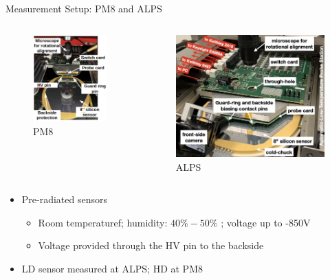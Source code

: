 \documentclass{beamer}
\begin{document}
\begin{frame}{Measurement Setup: PM8 and ALPS}
  \begin{columns}[b]
      \begin{figure}
          \includegraphics[width=.65\textwidth]{plots/PM8_description.png}
          \caption{PM8}
      \end{figure}
      \begin{figure}
          \includegraphics[width=.65\textwidth]{plots/ALPS_setup.png}
          \caption{ALPS}
      \end{figure}
  \end{columns}
    \begin{itemize}
        \small
        \item Pre-radiated sensors
            \begin{itemize}
                \scriptsize
                \item  Room temperaturef; humidity: $ 40\% - 50\%$ ;  voltage up to \alert{-850V}
                \item Voltage provided through the HV pin to the backside
            \end{itemize}
        \item LD sensor measured at ALPS; HD at PM8
    \end{itemize}
\end{frame}
\end{document}
